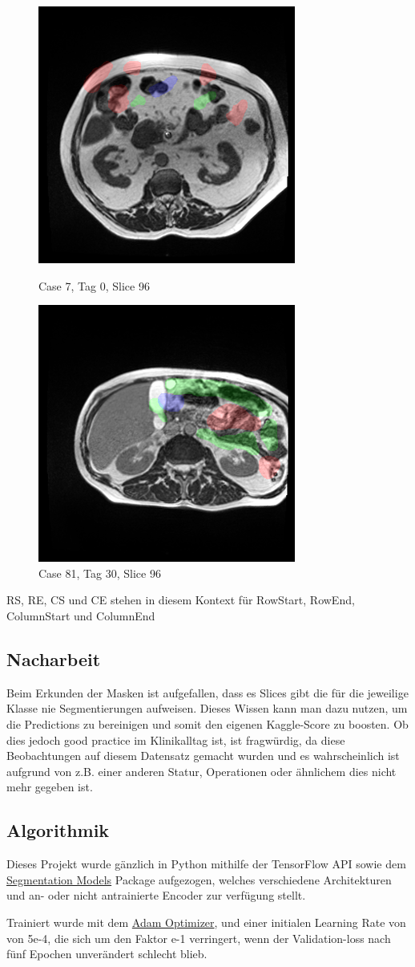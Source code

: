 \begin{figure}[htp]
\centering
\includegraphics[width=.25\textwidth]{bilder/case7-day0-slice-0096}\hfill
\caption{Case 7, Tag 0, Slice 96}
\includegraphics[width=.25\textwidth]{bilder/case81-day30-slice-0096}\hfill
\caption{Case 81, Tag 30, Slice 96}
\label{fig:cut}
\end{figure}

RS, RE, CS und CE stehen in diesem Kontext für RowStart, RowEnd, ColumnStart und ColumnEnd

\subsection{Nacharbeit}

Beim Erkunden der Masken ist aufgefallen, dass es Slices gibt die für die jeweilige Klasse nie Segmentierungen aufweisen. Dieses Wissen kann man dazu nutzen, um die Predictions zu bereinigen und somit den eigenen Kaggle-Score zu boosten. Ob dies jedoch good practice im Klinikalltag ist, ist fragwürdig, da diese Beobachtungen auf diesem Datensatz gemacht wurden und es wahrscheinlich ist aufgrund von z.B. einer anderen Statur, Operationen oder ähnlichem dies nicht mehr gegeben ist.

\subsection{Algorithmik}

Dieses Projekt wurde gänzlich in Python mithilfe der TensorFlow API sowie dem
 \href{https://deepai.org/machine-learning-glossary-and-terms/relu}{Segmentation Models} \citep{Yakubovskiy:2019}
 Package aufgezogen, welches verschiedene Architekturen und an- oder nicht antrainierte Encoder zur verfügung stellt. 
 
 Trainiert wurde mit dem
\href{https://optimization.cbe.cornell.edu/index.php?title=Adam}{Adam Optimizer},
 und einer initialen Learning Rate von von 5e-4, die sich um den Faktor e-1 verringert, wenn der Validation-loss nach fünf Epochen unverändert schlecht blieb. 
 
